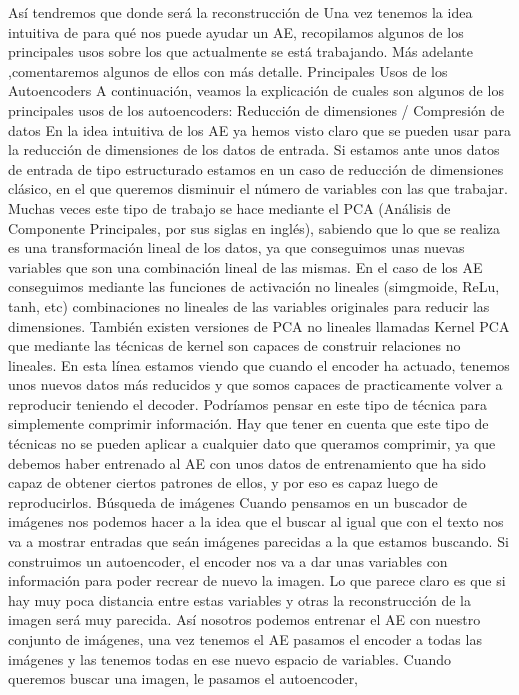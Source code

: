 \documentclass[
  a4paper,
  DIV=11,
  numbers=noendperiod]{scrreprt}
\begin{document}
Así tendremos que donde será la reconstrucción de Una vez tenemos la
idea intuitiva de para qué nos puede ayudar un AE, recopilamos algunos
de los principales usos sobre los que actualmente se está trabajando.
Más adelante ,comentaremos algunos de ellos con más detalle. Principales
Usos de los Autoencoders A continuación, veamos la explicación de cuales
son algunos de los principales usos de los autoencoders: Reducción de
dimensiones / Compresión de datos En la idea intuitiva de los AE ya
hemos visto claro que se pueden usar para la reducción de dimensiones de
los datos de entrada. Si estamos ante unos datos de entrada de tipo
estructurado estamos en un caso de reducción de dimensiones clásico, en
el que queremos disminuir el número de variables con las que trabajar.
Muchas veces este tipo de trabajo se hace mediante el PCA (Análisis de
Componente Principales, por sus siglas en inglés), sabiendo que lo que
se realiza es una transformación lineal de los datos, ya que conseguimos
unas nuevas variables que son una combinación lineal de las mismas. En
el caso de los AE conseguimos mediante las funciones de activación no
lineales (simgmoide, ReLu, tanh, etc) combinaciones no lineales de las
variables originales para reducir las dimensiones. También existen
versiones de PCA no lineales llamadas Kernel PCA que mediante las
técnicas de kernel son capaces de construir relaciones no lineales. En
esta línea estamos viendo que cuando el encoder ha actuado, tenemos unos
nuevos datos más reducidos y que somos capaces de practicamente volver a
reproducir teniendo el decoder. Podríamos pensar en este tipo de técnica
para simplemente comprimir información. Hay que tener en cuenta que este
tipo de técnicas no se pueden aplicar a cualquier dato que queramos
comprimir, ya que debemos haber entrenado al AE con unos datos de
entrenamiento que ha sido capaz de obtener ciertos patrones de ellos, y
por eso es capaz luego de reproducirlos. Búsqueda de imágenes Cuando
pensamos en un buscador de imágenes nos podemos hacer a la idea que el
buscar al igual que con el texto nos va a mostrar entradas que seán
imágenes parecidas a la que estamos buscando. Si construimos un
autoencoder, el encoder nos va a dar unas variables con información para
poder recrear de nuevo la imagen. Lo que parece claro es que si hay muy
poca distancia entre estas variables y otras la reconstrucción de la
imagen será muy parecida. Así nosotros podemos entrenar el AE con
nuestro conjunto de imágenes, una vez tenemos el AE pasamos el encoder a
todas las imágenes y las tenemos todas en ese nuevo espacio de
variables. Cuando queremos buscar una imagen, le pasamos el autoencoder,
\end{document}
